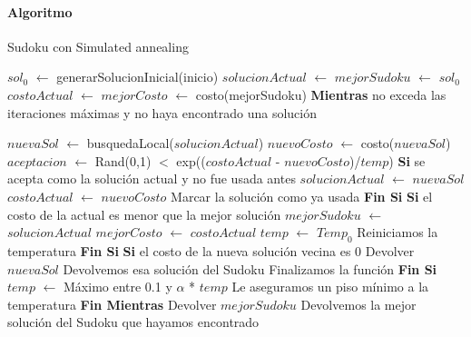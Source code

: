 \paragraph{Algoritmo}
\begin{algorithm}
\caption{Sudoku con Simulated annealing}\label{SimulatedAnnealing}
\begin{algorithmic}[1]

\State $sol_{0}$ $\gets$ generarSolucionInicial(inicio)
\State $solucionActual$  $\gets$ $mejorSudoku$   $\gets$ $sol_{0}$ 
\State $costoActual$ $\gets$ $mejorCosto$ $\gets$ costo(mejorSudoku)
\State \textbf{Mientras} no exceda las iteraciones m\'aximas y no haya encontrado una soluci\'on 

\State \indent  $nuevaSol$ $\gets$ busquedaLocal($solucionActual$)
\State \indent  $nuevoCosto$ $\gets$ costo($nuevaSol$)
\State \indent  $aceptacion$ $\gets$ Rand(0,1) $<$ exp(($costoActual$ - $nuevoCosto$)/$temp$)
\State \indent\textbf{Si} se acepta como la soluci\'on actual y no fue usada antes
\State \indent\indent $solucionActual$ $\gets$ $nuevaSol$
\State \indent\indent $costoActual$ $\gets$ $nuevoCosto$
\State \indent\indent Marcar la soluci\'on como ya usada
\State \indent\textbf{Fin Si}
\State \indent\textbf{Si} el costo de la actual es menor que la mejor soluci\'on
\State \indent\indent $mejorSudoku$ $\gets$ $solucionActual$
\State \indent\indent $mejorCosto$ $\gets$ $costoActual$
\State \indent\indent $temp$ $\gets$ $Temp_{0}$
\Comment Reiniciamos la temperatura
\State \indent\textbf{Fin Si}
\State \indent\textbf{Si} el costo de la nueva soluci\'on vecina es 0
\State \indent\indent Devolver $nuevaSol$
\Comment Devolvemos esa soluci\'on del Sudoku
\State \indent\indent Finalizamos la funci\'on
\State \indent\textbf{Fin Si}
\State \indent $temp$ $\gets$ M\'aximo entre 0.1 y $\alpha$ * $temp$
\Comment Le aseguramos un piso mínimo a la temperatura
\State \textbf{Fin Mientras}
\State Devolver $mejorSudoku$
\Comment Devolvemos la mejor soluci\'on del Sudoku que hayamos encontrado
\EndFunction
\end{algorithmic}
\end{algorithm}

